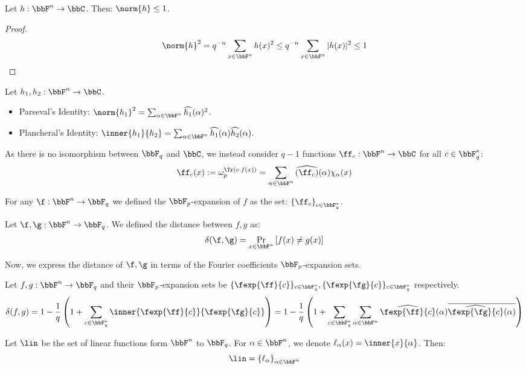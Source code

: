\begin{corollary}
Let $h:\bbF^n\rightarrow\bbC$. Then: $\norm{h}\le1$. 
\end{corollary}
\begin{proof}
$$
\norm{h}^2= q^{-n}\sum_{x\in\bbF^n}h(x)^2\le q^{-n}\sum_{x\in\bbF^n}|h(x)|^2\le 1
$$
\end{proof}

\begin{theorem}Let $h_1,h_2:\bbF^n\rightarrow\bbC$.
\begin{itemize}
    \item Parseval's Identity: $\norm{h_1}^2 = \sum_{\alpha\in\bbF^n}\widehat{h_1}(\alpha)^2$.
    \item Plancheral's Identity: $\inner{h_1}{h_2} = \sum_{\alpha\in\bbF^n}\widehat{h_1}(\alpha)\widehat{h_2}(\alpha)$.
\end{itemize}
\end{theorem}

As there is no isomorphism between $\bbF_q$ and $\bbC$, we instead consider $q-1$ functions $\ff_c:\bbF^n\rightarrow \bbC$ for all $c\in \bbF_q^{*}$:
\begin{align}
\ff_c(x) := \omega_p^{\Tr(c\cdot f(x))} = \sum_{\alpha\in \bbF^n} \widehat{\left(\ff_c\right)}(\alpha)\chi_{\alpha}(x)
\end{align}
\begin{definition}
For any $\f:\bbF^n\rightarrow \bbF_q$ we defined the $\bbF_p$-expansion of $f$ as the set:
$
\left\{\ff_c\right\}_{c\in\bbF_q^{*}}
$.
\end{definition}

\begin{definition}
Let $\f,\g:\bbF^n\rightarrow\bbF_q$. We defined the distance between $f,g$ as:
\[
\delta(\f,\g) =\Pr_{x\in\bbF^n}\left[f(x)\ne g(x)\right] 
\]
\end{definition}

Now, we express the distance of $\f,\g$ in terms of the Fourier coefficients $\bbF_p$-expansion sets. 
\begin{claim} \label{claim: delta(f,g)}Let $f,g:\bbF^n\rightarrow\bbF_q$ and their $\bbF_p$-expansion sets be $\{\fexp{\ff}{c}\}_{c\in\bbF_q^{*}},\{\fexp{\fg}{c}\}_{c\in\bbF_q^{*}}$ respectively.
$$\delta(f,g) = 1-\frac{1}{q}\left(1+\sum_{c\in\bbF_q^{*}}\inner{\fexp{\ff}{c}}{\fexp{\fg}{c}}\right) = 1-\frac{1}{q}\left(1+\sum_{c\in\bbF_q^{*}}\sum_{\alpha\in\bbF^n}\widehat{\fexp{\ff}{c}}(\alpha)\overline{\widehat{\fexp{\fg}{c}}(\alpha)} \right)$$    
\end{claim}
\begin{definition}
Let $\lin$ be the set of linear functions form $\bbF^n$ to $\bbF_q$. For $\alpha\in\bbF^n$, we denote $\ell_{\alpha}(x) = \inner{x}{\alpha}$. Then:
\[
\lin = \left\{\ell_{\alpha}\right\}_{\alpha\in\bbF^n}
\]
\end{definition}


